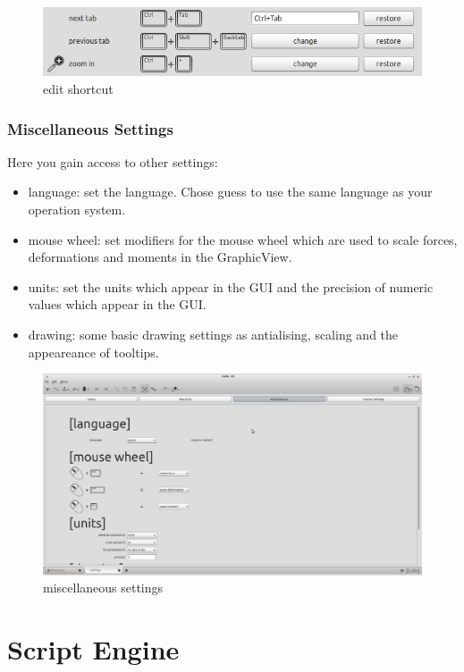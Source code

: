 \documentclass[a4paper,11pt]{report}
\begin{document}
\begin{figure}[H]
\includegraphics[width=\textwidth]{./pictures/editshortcut.png}
\caption{edit shortcut}
\label{pic:editshortcut}
\end{figure}

\subsection{Miscellaneous Settings}
\label{ssec:miscsettings}
Here you gain access to other settings:
\begin{itemize}
	\item language: set the language. Chose guess to use the same language as your operation system.
	\item mouse wheel: set modifiers for the mouse wheel which are used to scale forces, deformations and moments in the GraphicView.
	\item units: set the units which appear in the GUI and the precision of numeric values which appear in the GUI.
	\item drawing: some basic drawing settings as antialising, scaling and the appeareance of tooltips.
\end{itemize}
\begin{figure}[H]
\includegraphics[width=\textwidth]{./pictures/settings_misc.png}
\caption{miscellaneous settings}
\label{pic:miscsettings}
\end{figure}

\chapter{Script Engine}
\label{cha:scripting}

\end{document}
